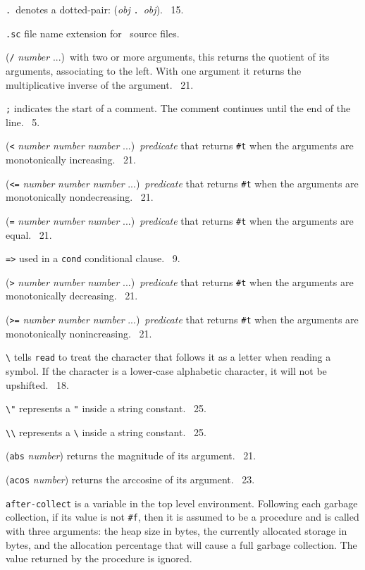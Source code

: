 \documentclass[10pt,twocolumn]{article}
\begin{document}
\texttt{.}\ denotes a dotted-pair: (\emph{obj}
\texttt{.}\ \emph{obj}).  \RRRRRS~15.

\texttt{.sc} file name extension for \StoC\ source files.

(\texttt{/} \emph{number} ...)\ with two or more arguments, this
returns the quotient of its arguments, associating to the left.  With
one argument it returns the multiplicative inverse of the argument.
\RRRRRS~21.

\texttt{;} indicates the start of a comment.  The comment continues
until the end of the line.  \RRRRRS~5.

(\texttt{<} \emph{number} \emph{number} \emph{number}
...)\ \emph{predicate} that returns \texttt{\#t} when the arguments
are monotonically increasing.  \RRRRRS~21.

(\texttt{<=} \emph{number} \emph{number} \emph{number}
...)\ \emph{predicate} that returns \texttt{\#t} when the arguments
are monotonically nondecreasing.  \RRRRRS~21.

(\texttt{=} \emph{number} \emph{number} \emph{number}
...)\ \emph{predicate} that returns \texttt{\#t} when the arguments
are equal.  \RRRRRS~21.

\texttt{=>} used in a \texttt{cond} conditional clause.  \RRRRRS~9.

(\texttt{>} \emph{number} \emph{number} \emph{number}
...)\ \emph{predicate} that returns \texttt{\#t} when the arguments
are monotonically decreasing.  \RRRRRS~21.

(\texttt{>=} \emph{number} \emph{number} \emph{number}
...)\ \emph{predicate} that returns \texttt{\#t} when the arguments
are monotonically nonincreasing. \RRRRRS~21.

\texttt{\textbackslash} tells \texttt{read} to treat the character
that follows it as a letter when reading a symbol.  If the character
is a lower-case alphabetic character, it will not be upshifted.
\RRRRRS~18.

\texttt{\textbackslash"} represents a \texttt{"} inside a string
constant.  \RRRRRS~25.

\texttt{\textbackslash\textbackslash} represents a
\texttt{\textbackslash} inside a string constant.  \RRRRRS~25.

(\texttt{abs} \emph{number}) returns the magnitude of its argument.
\RRRRRS~21.

(\texttt{acos} \emph{number}) returns the arccosine of its argument.
\RRRRRS~23.

\texttt{after-collect} is a variable in the top level environment.
Following each garbage collection, if its value is not \texttt{\#f},
then it is assumed to be a procedure and is called with three
arguments: the heap size in bytes, the currently allocated storage in
bytes, and the allocation percentage that will cause a full garbage
collection.  The value returned by the procedure is ignored.
\end{document}
